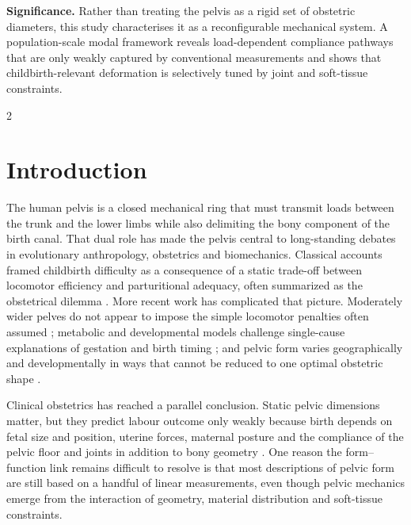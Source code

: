 \documentclass[openacc]{rsproca_new}
\begin{document}
\begin{fmtext}
\noindent \textbf{Significance.} Rather than treating the pelvis as a rigid set of obstetric diameters, this study characterises it as a reconfigurable mechanical system. A population-scale modal framework reveals load-dependent compliance pathways that are only weakly captured by conventional measurements and shows that childbirth-relevant deformation is selectively tuned by joint and soft-tissue constraints.
\end{fmtext}

\maketitle

\begin{multicols}{2}

\section{Introduction}

The human pelvis is a closed mechanical ring that must transmit loads between the trunk and the lower limbs while also delimiting the bony component of the birth canal. That dual role has made the pelvis central to long-standing debates in evolutionary anthropology, obstetrics and biomechanics. Classical accounts framed childbirth difficulty as a consequence of a static trade-off between locomotor efficiency and parturitional adequacy, often summarized as the obstetrical dilemma \cite{Washburn1960,Rosenberg1995,Trevathan2015,Grunstra2023}. More recent work has complicated that picture. Moderately wider pelves do not appear to impose the simple locomotor penalties often assumed \cite{Warrener2015}; metabolic and developmental models challenge single-cause explanations of gestation and birth timing \cite{Dunsworth2012}; and pelvic form varies geographically and developmentally in ways that cannot be reduced to one optimal obstetric shape \cite{BettiManica2018,Novak2020}.

Clinical obstetrics has reached a parallel conclusion. Static pelvic dimensions matter, but they predict labour outcome only weakly because birth depends on fetal size and position, uterine forces, maternal posture and the compliance of the pelvic floor and joints in addition to bony geometry \cite{Pavlicev2020,Stansfield2021a}. One reason the form--function link remains difficult to resolve is that most descriptions of pelvic form are still based on a handful of linear measurements, even though pelvic mechanics emerge from the interaction of geometry, material distribution and soft-tissue constraints.


\end{multicols}
\end{document}
